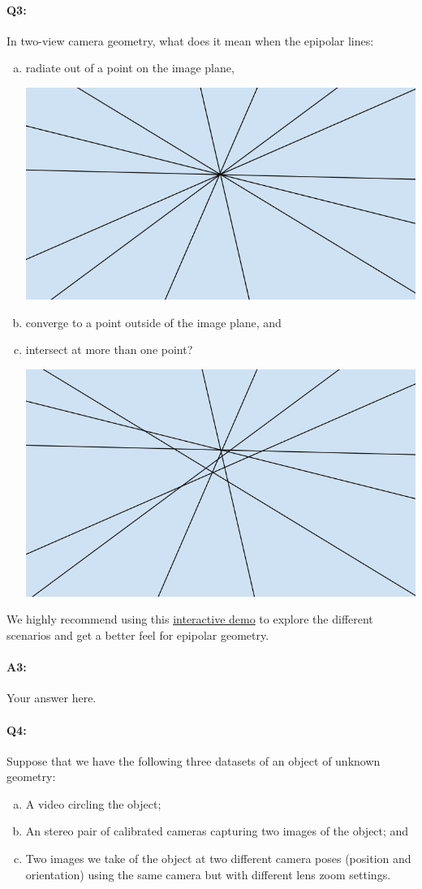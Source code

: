 \paragraph{Q3:} In two-view camera geometry, what does it mean when the epipolar lines:
\begin{enumerate}[(a)]
\item radiate out of a point on the image plane,

\includegraphics[width = 0.25\linewidth]{hw3-q3-intersect-at-1-point.PNG}
\item converge to a point outside of the image plane, and
\item intersect at more than one point?

\includegraphics[width = 0.25\linewidth]{hw3-q3-not-rank-defficient.PNG}
\end{enumerate}

We highly recommend using this \href{https://browncsci1430.github.io/webpage/demos/stereo_camera_visualization/index.html}{interactive demo} to explore the different scenarios and get a better feel for epipolar geometry.


\paragraph{A3:} Your answer here.






\pagebreak
\paragraph{Q4:}
Suppose that we have the following three datasets of an object of unknown geometry:
\begin{enumerate}[(a)]
\item A video circling the object;
\item An stereo pair of calibrated cameras capturing two images of the object; and
\item Two images we take of the object at two different camera poses (position and orientation) using the same camera but with different lens zoom settings.
\end{enumerate}

